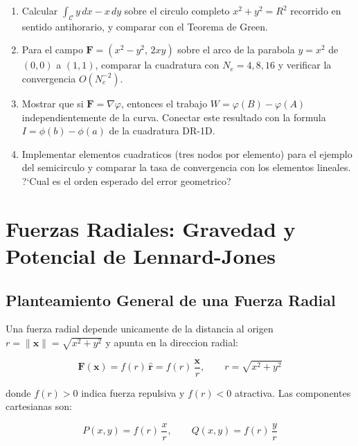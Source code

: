 \documentclass[12pt,a4paper]{article}
\begin{document}
\begin{enumerate}
    \item Calcular $\int_\mathcal{C} y\,dx - x\,dy$ sobre el circulo
    completo $x^2 + y^2 = R^2$ recorrido en sentido antihorario, y
    comparar con el Teorema de Green.

    \item Para el campo $\mathbf{F} = (x^2-y^2,\,2xy)$ sobre el arco
    de la parabola $y = x^2$ de $(0,0)$ a $(1,1)$, comparar la
    cuadratura con $N_e = 4, 8, 16$ y verificar la convergencia $O(N_e^{-2})$.

    \item Mostrar que si $\mathbf{F} = \nabla\varphi$, entonces el trabajo
    $W = \varphi(B) - \varphi(A)$ independientemente de la curva. Conectar
    este resultado con la formula $I = \phi(b) - \phi(a)$ de la cuadratura
    DR-1D.

    \item Implementar elementos cuadraticos (tres nodos por elemento) para
    el ejemplo del semicirculo y comparar la tasa de convergencia con los
    elementos lineales. ?`Cual es el orden esperado del error geometrico?
\end{enumerate}

\section{Fuerzas Radiales: Gravedad y Potencial de Lennard-Jones}

\subsection{Planteamiento General de una Fuerza Radial}

Una fuerza radial depende unicamente de la distancia al origen
$r = \|\mathbf{x}\| = \sqrt{x^2+y^2}$ y apunta en la direccion radial:

\begin{equation}
    \mathbf{F}(\mathbf{x}) = f(r)\,\hat{\mathbf{r}}
    = f(r)\,\frac{\mathbf{x}}{r},
    \qquad r = \sqrt{x^2+y^2}
\end{equation}

donde $f(r) > 0$ indica fuerza repulsiva y $f(r) < 0$ atractiva.
Las componentes cartesianas son:

\begin{equation}
    P(x,y) = f(r)\,\frac{x}{r}, \qquad Q(x,y) = f(r)\,\frac{y}{r}
\end{equation}
\end{document}
